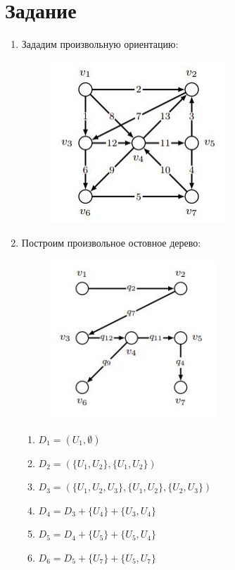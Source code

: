 \documentclass[a4paper, 12pt]{article}
\newcommand{\RNum}[1]{\uppercase\expandafter{\romannumeral #1\relax}}
\begin{document}
\section{Задание \RNum{6}}
\begin{enumerate}
    \item Зададим произвольную ориентацию:
    \begin{figure}[h]
        \includegraphics{6_orgraph}
    \end{figure}
    \item Построим произвольное остовное дерево:
    \begin{figure}[h]
        \includegraphics{6_tree}
    \end{figure}
    \begin{enumerate}[label*=\arabic*.]
        \item $ D_1 = (U_1, \emptyset) $
        \item $ D_2 = (\{U_{ 1}, U_{ 2}\}, \{U_{ 1}, U_{ 2}\})$
        \item $ D_3 = (\{U_{ 1}, U_{ 2}, U_{ 3}\}, \{U_{ 1}, U_{ 2}\}, \{U_{ 2}, U_{ 3}\})$
        \item $ D_4 = D_3 + \{U_{ 4}\} + \{U_{ 3}, U_{ 4}\} $
        \item $ D_5 = D_4 + \{U_{ 5}\} + \{U_{ 5}, U_{ 4}\} $
        \item $ D_6 = D_5 + \{U_{ 7}\} + \{U_{ 5}, U_{ 7}\} $

\end{enumerate}
\end{enumerate}
\end{document}
